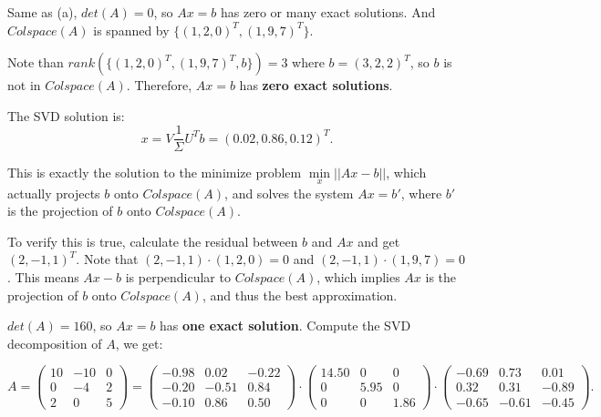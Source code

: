 \documentclass[
  course = {{16-811 Math Fundamentals for Robotics}},
  quartile = {{1}},
  assignment = 1,
  name = {{Kangle Deng}},
  email = {{kangled@andrew.cmu.edu}},
  firstexercise = 1
]{aga-homework}
\begin{document}
\subexercise

Same as (a), $det(A) = 0$, so $Ax = b$ has zero or many exact solutions. And $Colspace(A)$ is spanned by $\{(1, 2, 0)^T, (1, 9, 7)^T\}$.

Note than $rank(\{(1, 2, 0)^T, (1, 9, 7)^T, b\}) = 3$ where $b = (3, 2, 2)^T$, so $b$ is not in $Colspace(A)$. Therefore, $Ax=b$ has \textbf{zero exact solutions}.

The SVD solution is:
\begin{equation*}
    x = V \frac{1}{\Sigma} U^T b = (0.02, 0.86, 0.12)^T.
\end{equation*}

This is exactly the solution to the minimize problem $\min\limits_{x}||Ax-b||$, which actually projects $b$ onto $Colspace(A)$, and solves the system $Ax=b'$, where $b'$ is the projection of $b$ onto $Colspace(A)$.


To verify this is true, calculate the residual between $b$ and $Ax$ and get $(2, -1, 1)^T$. Note that $(2, -1, 1) \cdot (1, 2, 0) = 0$ and $(2, -1, 1) \cdot (1, 9, 7) = 0$. This means $Ax-b$ is perpendicular to $Colspace(A)$, which implies $Ax$ is the projection of $b$ onto $Colspace(A)$, and thus the best approximation.

\subexercise
$det(A) = 160$, so $Ax=b$ has \textbf{one exact solution}. Compute the SVD decomposition of $A$, we get:

\begin{equation*}
    A = 
    \left(
    \begin{array}{ccc}
        10 & -10 & 0 \\
        0 & -4 & 2 \\
        2 & 0 & 5
    \end{array}
    \right) =
    \left(
    \begin{array}{ccc}
        -0.98 & 0.02 & -0.22 \\
        -0.20 & -0.51 & 0.84 \\
        -0.10 & 0.86 & 0.50
    \end{array}
    \right) \cdot
    \left(
    \begin{array}{ccc}
        14.50 & 0 & 0 \\
        0 & 5.95 & 0 \\
        0 & 0 & 1.86
    \end{array}
    \right) \cdot
    \left(
    \begin{array}{ccc}
        -0.69 & 0.73 & 0.01 \\
        0.32 & 0.31 & -0.89 \\
        -0.65 & -0.61 & -0.45
    \end{array}
    \right).
\end{equation*}
\end{document}

